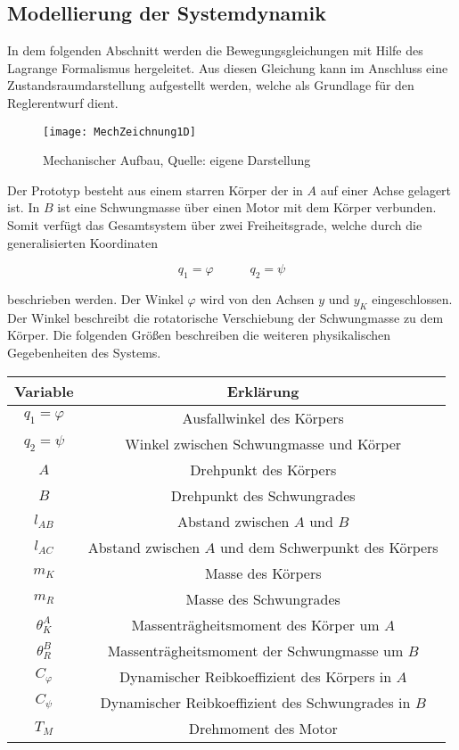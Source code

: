 \subsection{Modellierung der Systemdynamik} \label{Dynamik_sec}
In dem folgenden Abschnitt werden die Bewegungsgleichungen mit Hilfe des Lagrange Formalismus hergeleitet. Aus diesen Gleichung kann im Anschluss eine Zustandsraumdarstellung aufgestellt werden, welche als Grundlage für den Reglerentwurf dient.

\begin{figure}[h]
\centering
\texttt{[image: MechZeichnung1D]}
\caption{Mechanischer Aufbau, Quelle: eigene Darstellung}
\end{figure}

Der Prototyp besteht aus einem starren Körper der in $A$ auf einer Achse gelagert ist. In $B$ ist eine Schwungmasse über einen Motor mit dem Körper verbunden. Somit verfügt das Gesamtsystem über zwei Freiheitsgrade, welche durch die generalisierten Koordinaten 

\begin{equation}
q_1 = \varphi \hspace{35pt} q_2 = \psi
\end{equation}

beschrieben werden. Der Winkel $\varphi$ wird von den Achsen $y$ und $y_K$ eingeschlossen. Der Winkel beschreibt die rotatorische Verschiebung der Schwungmasse zu dem Körper. Die folgenden Größen beschreiben die weiteren physikalischen Gegebenheiten des Systems.\newline

\begin{table}[h]
\centering
\begin{tabular}{|c|c|}
\hline
	\textbf{Variable} & \textbf{Erklärung} \\ \hline
	$q_1 = \varphi$ & Ausfallwinkel des Körpers \\ \hline
	$q_2 = \psi$ & Winkel zwischen Schwungmasse und Körper \\ \hline
	$A$ & Drehpunkt des Körpers \\ \hline
	$B$ & Drehpunkt des Schwungrades \\ \hline
	$l_{AB}$ & Abstand zwischen $A$ und $B$ \\ \hline
	$l_{AC}$ & Abstand zwischen $A$ und dem Schwerpunkt des Körpers \\ \hline
	$m_K$ & Masse des Körpers \\ \hline
	$m_R$ & Masse des Schwungrades \\ \hline
	${\theta}^A_K$ & Massenträgheitsmoment des Körper um $A$ \\ \hline
	${\theta}^B_R$ & Massenträgheitsmoment der Schwungmasse um $B$ \\ \hline
	$C_{\varphi}$ & Dynamischer Reibkoeffizient des Körpers in $A$ \\ \hline
	$C_{\psi}$ & Dynamischer Reibkoeffizient des Schwungrades in $B$ \\ \hline
	$T_M$ & Drehmoment des Motor \\ \hline
\end{tabular}
\end{table}

